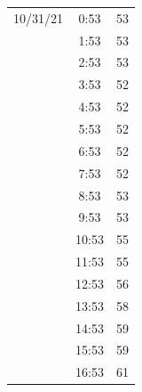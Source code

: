 \documentclass[nooutcomes]{ximera}
\begin{document}
\begin{problem}
\begin{tabular}{|c|c|c|}
10/31/21   &  0:53  &  53 \\
             &  1:53  &  53 \\
             &  2:53  &  53 \\
             &  3:53  &  52 \\
             &  4:53  &  52 \\
             &  5:53  &  52 \\
             &  6:53  &  52 \\
             &  7:53  &  52 \\
             &  8:53  &  53 \\
             &  9:53  &  53 \\
             &  10:53  &  55 \\
             &  11:53  &  55 \\
             &  12:53  &  56 \\
             &  13:53  &  58 \\
             &  14:53  &  59 \\
             &  15:53  &  59 \\
             &  16:53  &  61 \\

\end{tabular}
\end{problem}
\end{document}
